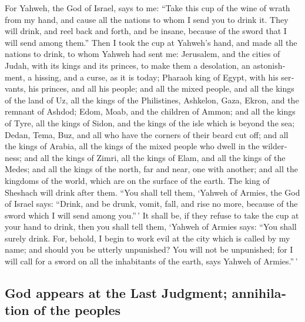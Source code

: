 \begin{paracol}{2}
\begin{otherlanguage}{english}
 For Yahweh, the God of Israel, says to me: ``Take this
cup of the wine of wrath from my hand, and cause all the nations to whom
I send you to drink it.  They will drink, and reel back
and forth, and be insane, because of the sword that I will send among
them.''  Then I took the cup at Yahweh's hand, and made
all the nations to drink, to whom Yahweh had sent me: 
Jerusalem, and the cities of Judah, with its kings and its princes, to
make them a desolation, an astonishment, a hissing, and a curse, as it
is today;  Pharaoh king of Egypt, with his servants, his
princes, and all his people;  and all the mixed people,
and all the kings of the land of Uz, all the kings of the Philistines,
Ashkelon, Gaza, Ekron, and the remnant of Ashdod;  Edom,
Moab, and the children of Ammon;  and all the kings of
Tyre, all the kings of Sidon, and the kings of the isle which is beyond
the sea;  Dedan, Tema, Buz, and all who have the corners
of their beard cut off;  and all the kings of Arabia, all
the kings of the mixed people who dwell in the wilderness;
 and all the kings of Zimri, all the kings of Elam, and
all the kings of the Medes;  and all the kings of the
north, far and near, one with another; and all the kingdoms of the
world, which are on the surface of the earth. The king of Sheshach will
drink after them.  ``You shall tell them, `Yahweh of
Armies, the God of Israel says: ``Drink, and be drunk, vomit, fall, and
rise no more, because of the sword which I will send among you.''\,'
 It shall be, if they refuse to take the cup at your hand
to drink, then you shall tell them, `Yahweh of Armies says: ``You shall
surely drink.  For, behold, I begin to work evil at the
city which is called by my name; and should you be utterly unpunished?
You will not be unpunished; for I will call for a sword on all the
inhabitants of the earth, says Yahweh of Armies.''\,'

\hypertarget{god-appears-at-the-last-judgment-annihilation-of-the-peoples}{%
\subsection{God appears at the Last Judgment; annihilation of the
peoples}\label{god-appears-at-the-last-judgment-annihilation-of-the-peoples}}


\end{otherlanguage}
\end{paracol}

